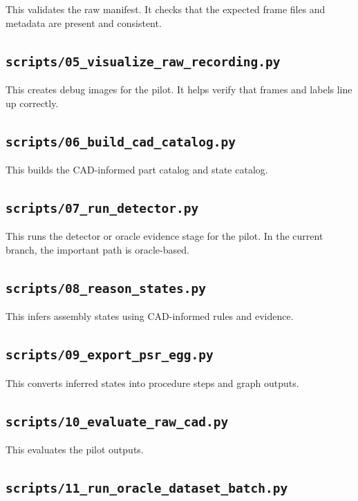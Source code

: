 \documentclass[11pt,a4paper]{article}
\begin{document}
This validates the raw manifest. It checks that the expected frame files and metadata are present and consistent.

\subsection{\texttt{scripts/05\_visualize\_raw\_recording.py}}

This creates debug images for the pilot. It helps verify that frames and labels line up correctly.

\subsection{\texttt{scripts/06\_build\_cad\_catalog.py}}

This builds the CAD-informed part catalog and state catalog.

\subsection{\texttt{scripts/07\_run\_detector.py}}

This runs the detector or oracle evidence stage for the pilot. In the current branch, the important path is oracle-based.

\subsection{\texttt{scripts/08\_reason\_states.py}}

This infers assembly states using CAD-informed rules and evidence.

\subsection{\texttt{scripts/09\_export\_psr\_egg.py}}

This converts inferred states into procedure steps and graph outputs.

\subsection{\texttt{scripts/10\_evaluate\_raw\_cad.py}}

This evaluates the pilot outputs.

\subsection{\texttt{scripts/11\_run\_oracle\_dataset\_batch.py}}
\end{document}
